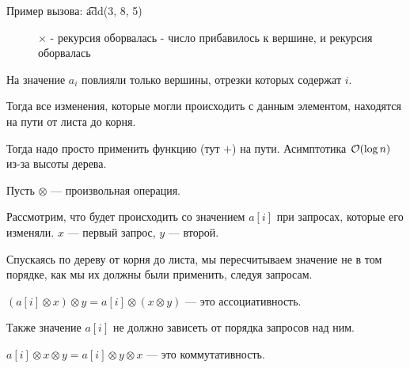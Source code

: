Пример вызова: \t{add(3, 8, 5)}
\up \up
\begin{center}
	\begin{figure}[h]
		\captionsetup{font=small, labelformat=empty}
		\caption{$\times$ - рекурсия оборвалась \checkmark - число прибавилось к вершине, и рекурсия оборвалась}
		\label{fig:image}
	\end{figure}
\end{center}


На значение $a_i$ повлияли только вершины, отрезки которых содержат $i$.

Тогда все изменения, которые могли происходить с данным элементом, находятся на пути от листа до корня. 

Тогда надо просто применить функцию (тут $+$) на пути. Асимптотика $\mathcal{O}(\log n)$ из-за высоты дерева.


Пусть $\otimes$ --- произвольная операция.

Рассмотрим, что будет происходить со значением $a[i]$ при запросах, которые его изменяли. $x$ --- первый запрос, $y$ --- второй.
\down

Спускаясь по дереву от корня до листа, мы пересчитываем значение не в том порядке, как мы их должны были применить, следуя запросам.

$(a[i] \otimes x) \otimes y = a[i] \otimes (x \otimes y)$ --- это ассоциативность.

Также значение $a[i]$ не должно зависеть от порядка запросов над ним.

$a[i] \otimes x \otimes y = a[i] \otimes y \otimes x$ --- это коммутативность.


